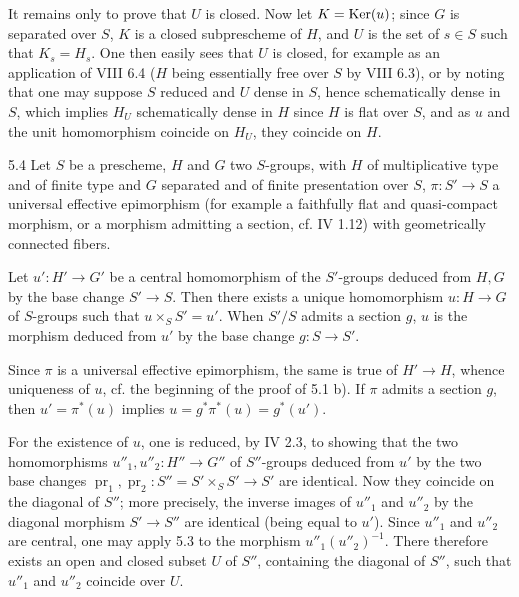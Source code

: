 It remains only to prove that $U$ is closed. Now let $K=\operatorname{Ker}(u)$; since $G$ is separated over $S$, $K$ is a closed subprescheme of $H$, and $U$ is the set of $s\in S$ such that $K_s=H_s$. One then easily sees that $U$ is closed, for example as an application of VIII 6.4 ($H$ being essentially free over $S$ by VIII 6.3), or by noting that one may suppose $S$ reduced and $U$ dense in $S$, hence schematically dense in $S$, which implies $H_U$ schematically dense in $H$ since $H$ is flat over $S$, and as $u$ and the unit homomorphism coincide on $H_U$, they coincide on $H$.
\begin{corollary}{5.4}\label{IX.5.4}
Let $S$ be a prescheme, $H$ and $G$ two $S$-groups, with $H$ of multiplicative type and of finite type and $G$ separated and of finite presentation over $S$, $\pi:S'\to S$ a universal effective epimorphism (for example a faithfully flat and quasi-compact morphism, or a morphism admitting a section, cf. IV 1.12) with geometrically connected fibers.

Let $u':H'\to G'$ be a central homomorphism of the $S'$-groups deduced from $H,G$ by the base change $S'\to S$. Then there exists a unique homomorphism $u:H\to G$ of $S$-groups such that $u\times_S S'=u'$. When $S'/S$ admits a section $g$, $u$ is the morphism deduced from $u'$ by the base change $g:S\to S'$.
\end{corollary}
Since $\pi$ is a universal effective epimorphism, the same is true of $H'\to H$, whence uniqueness of $u$, cf. the beginning of the proof of 5.1 b). If $\pi$ admits a section $g$, then $u'=\pi^*(u)$ implies $u=g^*\pi^*(u)=g^*(u')$.

For the existence of $u$, one is reduced, by IV 2.3, to showing that the two homomorphisms $u''_1,u''_2:H''\to G''$ of $S''$-groups deduced from $u'$ by the two base changes $\operatorname{pr}_1,\operatorname{pr}_2:S''=S'\times_S S'\to S'$ are identical. Now they coincide on the diagonal of $S''$; more precisely, the inverse images of $u''_1$ and $u''_2$ by the diagonal morphism $S'\to S''$ are identical (being equal to $u'$). Since $u''_1$ and $u''_2$ are central, one may apply 5.3 to the morphism $u''_1(u''_2)^{-1}$. There therefore exists an open and closed subset $U$ of $S''$, containing the diagonal of $S''$, such that $u''_1$ and $u''_2$ coincide over $U$.

